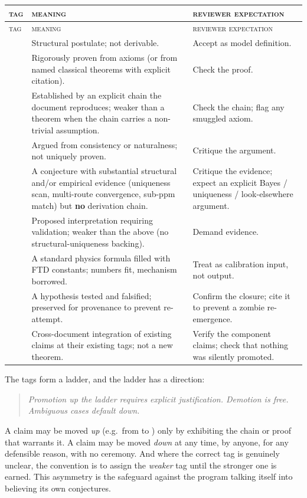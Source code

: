 \begingroup
\footnotesize
\renewcommand{\arraystretch}{1.25}
\setlength{\LTpre}{8pt}\setlength{\LTpost}{8pt}
\begin{xltabular}{\linewidth}{@{}l >{\RaggedRight\arraybackslash}X >{\RaggedRight\arraybackslash}X@{}}
  \toprule
  \textsc{tag} & \textsc{meaning} & \textsc{reviewer expectation}\\
  \midrule
  \endfirsthead
  \toprule
  \textsc{tag} & \textsc{meaning} & \textsc{reviewer expectation}\\
  \midrule
  \endhead
  \bottomrule
  \endlastfoot
   & Structural postulate; not derivable. & Accept as model definition.\\
   & Rigorously proven from axioms (or from named classical theorems
    with explicit citation). & Check the proof.\\
   & Established by an explicit chain the document reproduces; weaker
    than a theorem when the chain carries a non-trivial assumption. & Check
    the chain; flag any smuggled axiom.\\
   & Argued from consistency or naturalness; not uniquely proven.
    & Critique the argument.\\
   & A conjecture with substantial structural and/or empirical
    evidence (uniqueness scan, multi-route convergence, sub-ppm match) but
    \textbf{no} derivation chain. & Critique the evidence; expect an explicit
    Bayes / uniqueness / look-elsewhere argument.\\
   & Proposed interpretation requiring validation; weaker than the
    above (no structural-uniqueness backing). & Demand evidence.\\
   & A standard physics formula filled with FTD constants; numbers
    fit, mechanism borrowed. & Treat as calibration input, not output.\\
   & A hypothesis tested and falsified; preserved for provenance to
    prevent re-attempt. & Confirm the closure; cite it to prevent a zombie
    re-emergence.\\
   & Cross-document integration of existing claims at their existing
    tags; not a new theorem. & Verify the component claims; check that nothing
    was silently promoted.\\
\end{xltabular}
\endgroup

 The tags form a ladder, and the ladder has a
direction:
\begin{quote}\itshape
  Promotion up the ladder requires explicit justification. Demotion is free.
  Ambiguous cases default down.
\end{quote}
\noindent A claim may be moved \emph{up} (e.g.\ from  to )
only by exhibiting the chain or proof that warrants it. A claim may be moved
\emph{down} at any time, by anyone, for any defensible reason, with no ceremony.
And where the correct tag is genuinely unclear, the convention is to assign the
\emph{weaker} tag until the stronger one is earned. This asymmetry is the
safeguard against the program talking itself into believing its own conjectures.

